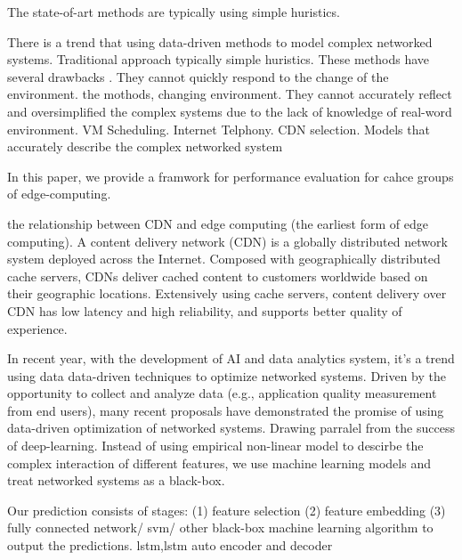 \documentclass[review]{elsarticle}
\begin{document}
The state-of-art methods are typically using simple huristics.


There is a trend \cite{Jiang2017Pytheas:Exploration-Exploitation} \cite{Mao2017NeuralPensieve} that using data-driven methods to model complex networked systems. Traditional approach typically simple huristics. These methods have several drawbacks  \cite{Mao2017NeuralPensieve}. They cannot quickly respond to the change of the environment. the mothods, changing environment. They cannot accurately reflect and oversimplified the complex systems due to the lack of knowledge of real-word environment. VM Scheduling. Internet Telphony. CDN selection. Models that accurately describe the complex networked system

In this paper, we provide a framwork for performance evaluation for cahce groups of edge-computing. 

the relationship between CDN and edge computing (the earliest form of edge computing). A content delivery network (CDN) is a globally distributed network system deployed across the Internet. Composed with geographically distributed cache servers, CDNs deliver cached content  to  customers  worldwide  based  on their geographic locations. Extensively  using  cache  servers,  content  delivery over  CDN  has  low  latency  and  high  reliability,  and  supports better quality of experience.

In recent year, with the development of AI and data analytics system, it’s a trend using data data-driven techniques to optimize networked systems. Driven by the opportunity to collect and analyze data (e.g., application quality measurement from end users), many recent proposals have demonstrated the promise of using data-driven optimization of networked systems. Drawing parralel from the success of deep-learning. Instead of using empirical non-linear model to descirbe the complex interaction of different features, we use machine learning models and treat networked systems as a black-box.

Our prediction consists of stages: (1) feature selection (2) feature embedding (3) fully connected network/ svm/ other black-box machine learning algorithm to output the predictions. 
lstm,lstm auto encoder and decoder
\end{document}
